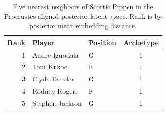 \begin{table}[htbp]
  \centering\small
  \begin{tabular}{rllc}
    \toprule
    Rank & Player & Position & Archetype \\
    \midrule
    1 & Andre Iguodala & G & 1 \\
    2 & Toni Kukoc & F & 1 \\
    3 & Clyde Drexler & G & 1 \\
    4 & Rodney Rogers & F & 1 \\
    5 & Stephen Jackson & G & 1 \\
    \bottomrule
  \end{tabular}
  \caption{Five nearest neighbors of Scottie Pippen in the Procrustes-aligned posterior latent space. Rank is by posterior mean embedding distance.}
  \label{tab:Scottie_Pippen_neighbors}
\end{table}

